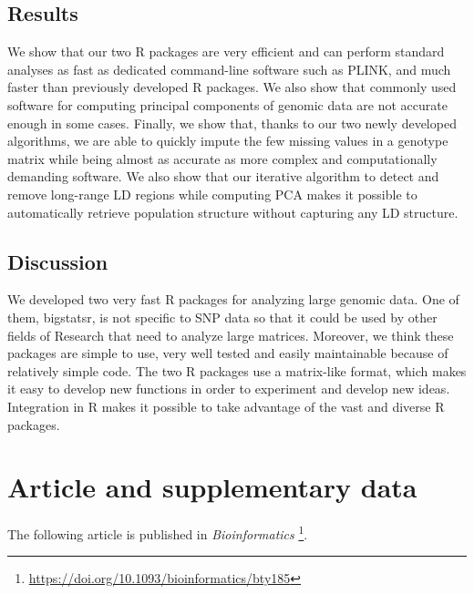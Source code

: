 \subsection{Results}

We show that our two R packages are very efficient and can perform standard analyses as fast as dedicated command-line software such as PLINK, and much faster than previously developed R packages.
We also show that commonly used software for computing principal components of genomic data are not accurate enough in some cases.
Finally, we show that, thanks to our two newly developed algorithms, we are able to quickly impute the few missing values in a genotype matrix while being almost as accurate as more complex and computationally demanding software. We also show that our iterative algorithm to detect and remove long-range LD regions while computing PCA makes it possible to automatically retrieve population structure without capturing any LD structure.

\subsection{Discussion}

We developed two very fast R packages for analyzing large genomic data. One of them, bigstatsr, is not specific to SNP data so that it could be used by other fields of Research that need to analyze large matrices.
Moreover, we think these packages are simple to use, very well tested and easily maintainable because of relatively simple code.
The two R packages use a matrix-like format, which makes it
easy to develop new functions in order to experiment and develop
new ideas. Integration in R makes it possible to take advantage of
the vast and diverse R packages.


\section{Article and supplementary data}

The following article is published in \textit{Bioinformatics}	\footnote{\url{https://doi.org/10.1093/bioinformatics/bty185}}.



